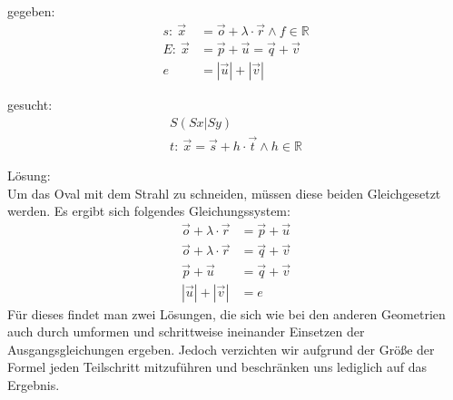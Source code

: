 \documentclass[reducespace,stylepage,semiarbeit]{spezidoc}
\begin{document}
gegeben:
\begin{subequations}
\begin{align}
s:~ \vec{x} &= \vec{o} + \lambda \cdot \vec{r} \wedge f \in \mathds{R} \nonumber \\
E:~ \vec{x} &= \vec{p} + \vec{u} = \vec{q} + \vec{v} \nonumber  \\
e &= |\vec{u}| + |\vec{v}| \nonumber
\end{align}
\end{subequations}

gesucht:
\begin{subequations}
\begin{align}
S(Sx|Sy)~~~~~~ \nonumber  \\
t:~ \vec{x} = \vec{s} + h \cdot \vec{t} \wedge h \in \mathds{R} \nonumber 
\end{align}
\end{subequations}

Lösung: \\
Um das Oval mit dem Strahl zu schneiden, müssen diese beiden Gleichgesetzt werden. Es ergibt sich folgendes Gleichungssystem:
\begin{equation*}
\begin{split}
\vec{o} + \lambda \cdot \vec{r} &= \vec{p} + \vec{u} \\
\vec{o} + \lambda \cdot \vec{r} &= \vec{q} + \vec{v} \\
\vec{p} + \vec{u} &= \vec{q} + \vec{v} \\
|\vec{u}| + |\vec{v}| &= e
\end{split}
\end{equation*}
Für dieses findet man zwei Lösungen, die sich wie bei den anderen Geometrien auch durch umformen und schrittweise ineinander Einsetzen der Ausgangsgleichungen ergeben. Jedoch verzichten wir aufgrund der Größe der Formel jeden Teilschritt mitzuführen und beschränken uns lediglich auf das Ergebnis.
\end{document}
